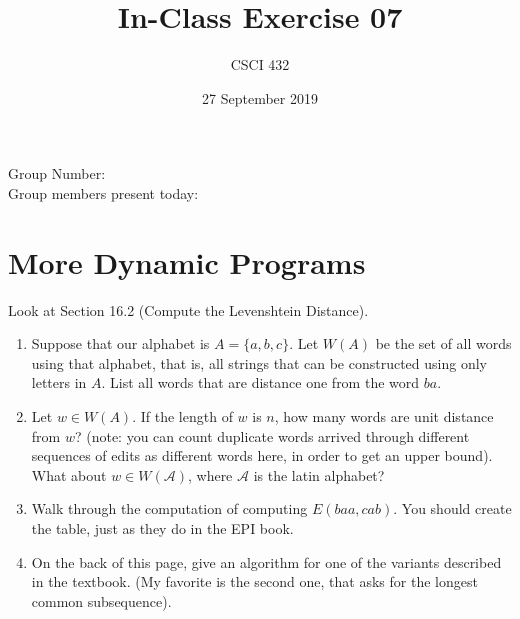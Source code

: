 \documentclass{article}
\title{In-Class Exercise 07}
\author{CSCI 432}
\date{27 September 2019}
\begin{document}
\maketitle

\noindent
Group Number:\\
Group members present today:

\section*{More Dynamic Programs}
Look at Section 16.2 (Compute the Levenshtein Distance).

\begin{enumerate}
    \item Suppose that our alphabet is $A=\{a,b,c\}$.  Let $W(A)$ be the set of all
        words using that alphabet, that is, all strings that can be constructed
        using only letters in $A$.  List all words that are distance one from
        the word $ba$.
        \vspace{1in}
    \item Let $w \in W(A)$.  If the length of $w$ is $n$, how many words are unit
        distance from $w$? (note: you
        can count duplicate words arrived through different sequences of edits
        as different words here, in order to get an upper bound).  What about $w
        \in W(\mathcal{A})$, where $\mathcal{A}$ is the latin alphabet?
        \vspace{1in}
    \item Walk through the computation of computing $E(baa,cab)$.  You should
        create the table, just as they do in the EPI book.
        \vspace{2in}
    \item On the back of this page, give an algorithm for one of the variants described in the textbook.
        (My favorite is the second one, that asks for the longest common
        subsequence).
\end{enumerate}
\end{document}
